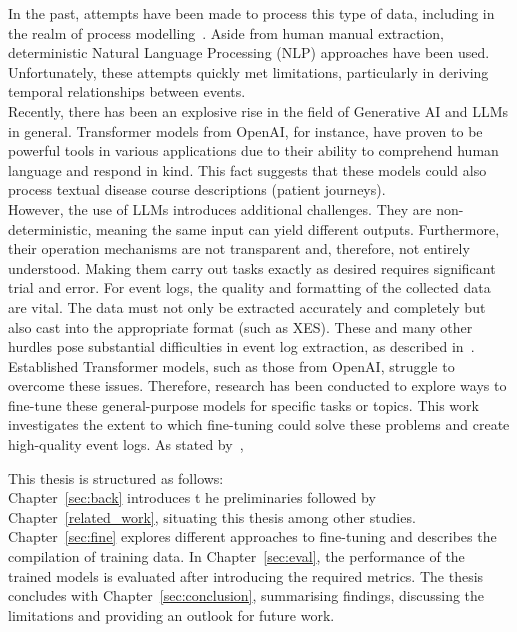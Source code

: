 In the past, attempts have been made to process this type of data, including in the realm of process modelling~\cite{friedrich_process_2011}. Aside from human manual extraction,  deterministic Natural Language Processing (NLP) approaches have been used. Unfortunately, these attempts quickly met limitations, particularly in deriving temporal relationships between events.\\
Recently, there has been an explosive rise in the field of Generative AI and LLMs in general. Transformer models from OpenAI, for instance, have proven to be powerful tools in various applications due to their ability to comprehend human language and respond in kind. This fact suggests that these models could also process textual disease course descriptions (patient journeys).\\
However, the use of LLMs introduces additional challenges. They are non-deterministic, meaning the same input can yield different outputs. Furthermore, their operation mechanisms are not transparent and, therefore, not entirely understood. Making them carry out tasks exactly as desired requires significant trial and error. For event logs, the quality and formatting of the collected data are vital. The data must not only be extracted accurately and completely but also cast into the appropriate format (such as XES).
These and many other hurdles pose substantial difficulties in event log extraction, as described in~\cite{munoz-gama_process_2022}. Established Transformer models, such as those from OpenAI, struggle to overcome these issues. Therefore, research has been conducted to explore ways to fine-tune these general-purpose models for specific tasks or topics. This work investigates the extent to which fine-tuning could solve these problems and create high-quality event logs. As stated by~\cite{latif_fine-tuning_2024}, 
\begin{quote}
\end{quote}

This thesis is structured as follows:\\
Chapter~\ref{sec:back} introduces t
he preliminaries followed by Chapter~\ref{related_work}, situating this thesis among other studies. Chapter~\ref{sec:fine} explores different approaches to fine-tuning and describes the compilation of training data. In Chapter~\ref{sec:eval}, the performance of the trained models is evaluated after introducing the required metrics. The thesis concludes with Chapter~\ref{sec:conclusion}, summarising findings, discussing the limitations and providing an outlook for future work.